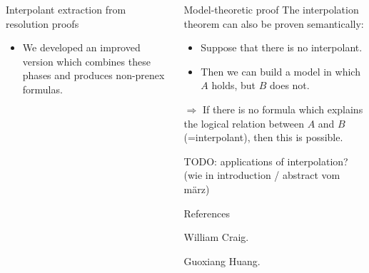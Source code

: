 \documentclass[final,hyperref={pdfpagelabels=true}]{beamer}
\begin{document}
\begin{frame}
\begin{columns}[t]
\begin{column}{\mycolwidth}
\begin{block}{Interpolant extraction from resolution proofs}
\begin{itemize}
					\item We developed an improved version which combines these phases and produces non-prenex formulas.
				\end{itemize}



			\end{block}

		\end{column}
		\begin{column}{\mycolwidth}

			\begin{block}{Model-theoretic proof}
				The interpolation theorem can also be proven semantically:
				\begin{itemize}
					\item Suppose that there is no interpolant.
					\item Then we can build a model in which $A$ holds, but $B$ does not.

				\end{itemize}

				$\Rightarrow$ If there is no formula which explains the logical relation between $A$ and $B$ (=interpolant), then this is possible.
			\end{block}



			TODO: applications of interpolation? (wie in introduction / abstract vom märz)


			\begin{block}{References}
				\begin{thebibliography}{999}

						William Craig.

						Guoxiang Huang.



\end{thebibliography}
\end{block}
\end{column}
\end{columns}
\end{frame}
\end{document}
